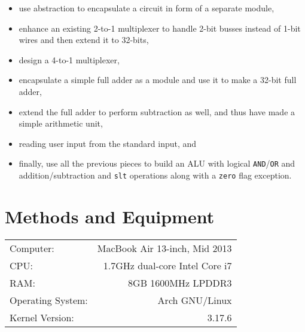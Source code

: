 \documentclass{article}
\begin{document}
\begin{itemize}
\item use abstraction to encapsulate a circuit in form of a separate module,

\item enhance an existing 2-to-1 multiplexer to handle 2-bit busses instead
of 1-bit wires and then extend it to 32-bits,

\item design a 4-to-1 multiplexer,

\item encapsulate a simple full adder as a module and use it to make a
32-bit full adder,

\item extend the full adder to perform subtraction as well,
and thus have made a simple arithmetic unit,

\item reading user input from the standard input, and

\item finally, use all the previous pieces to build an ALU with
logical \verb$AND$/\verb$OR$ and addition/subtraction and \verb$slt$ operations
along with a \verb$zero$ flag exception.

\end{itemize}


\section{Methods and Equipment}

\begin{center}
\begin{tabular}{l r}
Computer: & MacBook Air 13-inch, Mid 2013 \\
CPU: & 1.7GHz dual-core Intel Core i7 \\
RAM: & 8GB 1600MHz LPDDR3 \\
Operating System: & Arch GNU/Linux \\
Kernel Version: & 3.17.6
\end{tabular}
\end{center}

\end{document}
